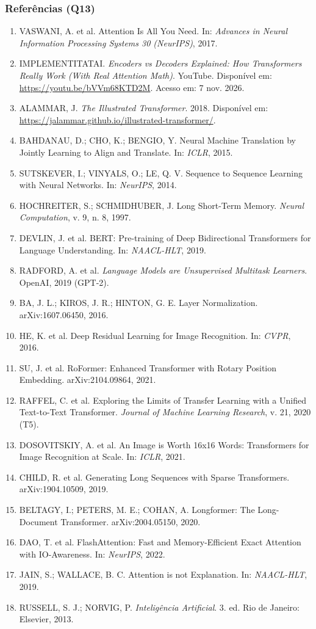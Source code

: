 \documentclass[12pt, a4paper]{article}
\providecommand{\tightlist}{%
  \setlength{\itemsep}{0pt}\setlength{\parskip}{0pt}}
\begin{document}
\subsubsection{Referências (Q13)}\label{referuxeancias-q13}

\begin{enumerate}
\def\labelenumi{\arabic{enumi}.}
\tightlist
\item
  VASWANI, A. et al. Attention Is All You Need. In: \emph{Advances in Neural Information Processing Systems 30 (NeurIPS)}, 2017.
\item
  IMPLEMENTITATAI. \emph{Encoders vs Decoders Explained: How Transformers Really Work (With Real Attention Math)}. YouTube. Disponível em: \url{https://youtu.be/bVVm68KTD2M}. Acesso em: 7 nov. 2026.
\item
  ALAMMAR, J. \emph{The Illustrated Transformer}. 2018. Disponível em: \url{https://jalammar.github.io/illustrated-transformer/}.
\item
  BAHDANAU, D.; CHO, K.; BENGIO, Y. Neural Machine Translation by Jointly Learning to Align and Translate. In: \emph{ICLR}, 2015.
\item
  SUTSKEVER, I.; VINYALS, O.; LE, Q. V. Sequence to Sequence Learning with Neural Networks. In: \emph{NeurIPS}, 2014.
\item
  HOCHREITER, S.; SCHMIDHUBER, J. Long Short-Term Memory. \emph{Neural Computation}, v. 9, n. 8, 1997.
\item
  DEVLIN, J. et al. BERT: Pre-training of Deep Bidirectional Transformers for Language Understanding. In: \emph{NAACL-HLT}, 2019.
\item
  RADFORD, A. et al. \emph{Language Models are Unsupervised Multitask Learners}. OpenAI, 2019 (GPT-2).
\item
  BA, J. L.; KIROS, J. R.; HINTON, G. E. Layer Normalization. arXiv:1607.06450, 2016.
\item
  HE, K. et al. Deep Residual Learning for Image Recognition. In: \emph{CVPR}, 2016.
\item
  SU, J. et al. RoFormer: Enhanced Transformer with Rotary Position Embedding. arXiv:2104.09864, 2021.
\item
  RAFFEL, C. et al. Exploring the Limits of Transfer Learning with a Unified Text-to-Text Transformer. \emph{Journal of Machine Learning Research}, v. 21, 2020 (T5).
\item
  DOSOVITSKIY, A. et al. An Image is Worth 16x16 Words: Transformers for Image Recognition at Scale. In: \emph{ICLR}, 2021.
\item
  CHILD, R. et al. Generating Long Sequences with Sparse Transformers. arXiv:1904.10509, 2019.
\item
  BELTAGY, I.; PETERS, M. E.; COHAN, A. Longformer: The Long-Document Transformer. arXiv:2004.05150, 2020.
\item
  DAO, T. et al. FlashAttention: Fast and Memory-Efficient Exact Attention with IO-Awareness. In: \emph{NeurIPS}, 2022.
\item
  JAIN, S.; WALLACE, B. C. Attention is not Explanation. In: \emph{NAACL-HLT}, 2019.
\item
  RUSSELL, S. J.; NORVIG, P. \emph{Inteligência Artificial}. 3. ed. Rio de Janeiro: Elsevier, 2013.
\end{enumerate}
\end{document}
